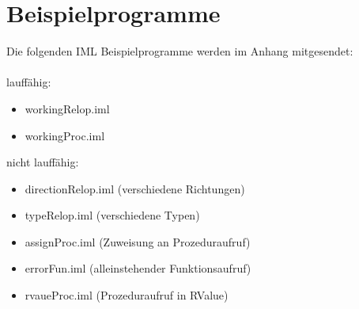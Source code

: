 \documentclass[a4paper,10pt]{article}
\begin{document}
\section{Beispielprogramme}
Die folgenden IML Beispielprogramme werden im Anhang mitgesendet:\\\\
lauff\"ahig:
\begin{itemize}
\item workingRelop.iml
\item workingProc.iml
\end{itemize}
nicht lauff\"ahig:
\begin{itemize}
\item directionRelop.iml (verschiedene Richtungen)
\item typeRelop.iml (verschiedene Typen)
\item assignProc.iml (Zuweisung an Prozeduraufruf)
\item errorFun.iml (alleinstehender Funktionsaufruf)
\item rvaueProc.iml  (Prozeduraufruf in RValue)
\end{itemize}
\end{document}
